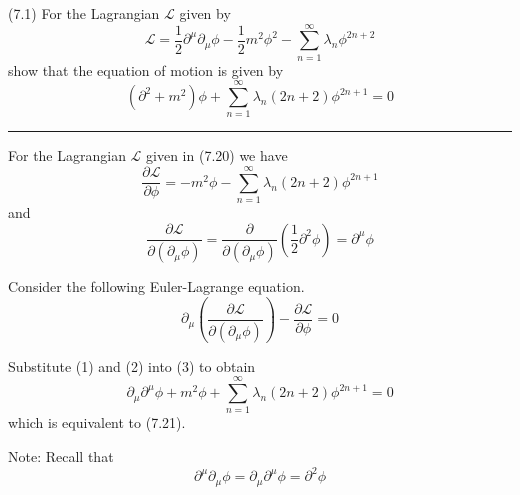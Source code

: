 \documentclass[12pt]{article}
\begin{document}
(7.1)
For the Lagrangian $\mathcal L$ given by
\begin{equation*}
\mathcal L=\frac{1}{2}\partial^\mu\partial_\mu\phi
-\frac{1}{2}m^2\phi^2-\sum_{n=1}^\infty\lambda_n\phi^{2n+2}
\tag{7.20}
\end{equation*}
show that the equation of motion is given by
\begin{equation*}
(\partial^2+m^2)\phi
+\sum_{n=1}^\infty\lambda_n(2n+2)\phi^{2n+1}=0
\tag{7.21}
\end{equation*}

\bigskip
\hrule

\bigskip
For the Lagrangian $\mathcal L$ given in (7.20) we have
\begin{equation*}
\frac{\partial\mathcal L}{\partial\phi}=-m^2\phi-\sum_{n=1}^\infty\lambda_n(2n+2)\phi^{2n+1}
\tag{1}
\end{equation*}
and
\begin{equation*}
\frac{\partial\mathcal L}{\partial(\partial_\mu\phi)}
=\frac{\partial}{\partial(\partial_\mu\phi)}\left(\frac{1}{2}\partial^2\phi\right)
=\partial^\mu\phi
\tag{2}
\end{equation*}

Consider the following Euler-Lagrange equation.
\begin{equation*}
\partial_\mu\left(\frac{\partial\mathcal L}{\partial(\partial_\mu\phi)}\right)-\frac{\partial\mathcal L}{\partial\phi}=0
\tag{3}
\end{equation*}

Substitute (1) and (2) into (3) to obtain
\begin{equation*}
\partial_\mu\partial^\mu\phi+m^2\phi+\sum_{n=1}^\infty\lambda_n(2n+2)\phi^{2n+1}=0
\end{equation*}
which is equivalent to (7.21).

\bigskip
Note: Recall that
\begin{equation*}
\partial^\mu\partial_\mu\phi=\partial_\mu\partial^\mu\phi=\partial^2\phi
\end{equation*}
\end{document}
